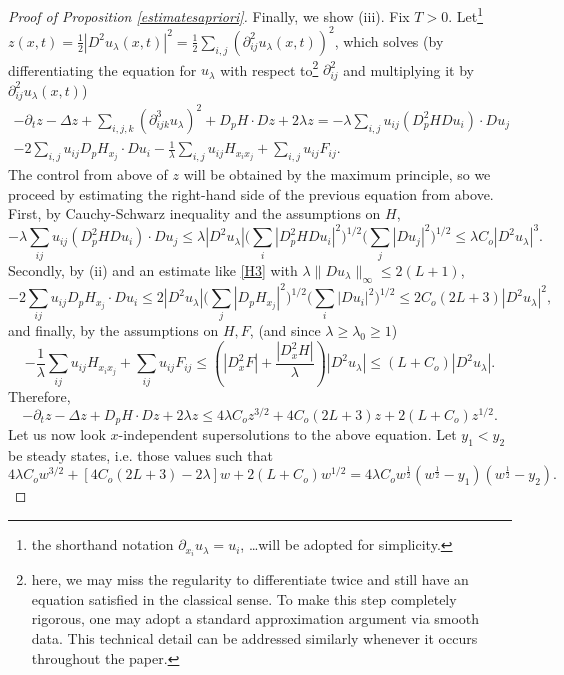 \documentclass{amsart}
\theoremstyle{remark}
\theoremstyle{definition}
\theoremstyle{Claim}
\theoremstyle{plain}
\begin{document}
\begin{proof}[Proof of Proposition \ref{estimatesapriori}]
		Finally, we show (iii). Fix $T>0$. Let\footnote{the shorthand notation $\partial_{x_i} u_\lambda = u_i$, \ldots will be adopted for simplicity.} $z(x,t) = \frac12 |D^2 u_\lambda(x,t)|^2 = \frac12\sum_{i,j} (\partial^2_{ij} u_\lambda(x,t))^2$, which solves (by differentiating the equation for $u_\lambda$ with respect to\footnote{here, we may miss the regularity to differentiate twice and still have an equation satisfied in the classical sense. To make this step completely rigorous, one may adopt a standard approximation argument via smooth data. This technical detail can be addressed similarly whenever it occurs throughout the paper.} $\partial^2_{ij}$ and multiplying it by $\partial^2_{ij} u_\lambda(x,t)$)
		\[
\begin{split}
	-\partial_t z-\Delta z + \displaystyle \sum_{i,j,k} (\partial^3_{ijk} u_\lambda)^2+D_pH \cdot Dz + 2\lambda z=  -\lambda \displaystyle  \sum_{i, j} u_{ij} (D^2_{p}H Du_i) \cdot Du_j \\- 2  \displaystyle  \sum_{i, j} u_{ij} D_pH_{x_j} \cdot Du_i - \frac1\lambda \sum_{i, j} u_{ij} H_{x_i x_j} + \sum_{i, j} u_{ij} F_{ij}.
\end{split}
		\]
		The control from above of $z$ will be obtained by the maximum principle, so we proceed by estimating the right-hand side of the previous equation from above. First, by Cauchy-Schwarz inequality and the assumptions on $H$,
		\[
		- \lambda \sum_{ij} u_{ij} (D^2_{p}H Du_i) \cdot Du_j \le \lambda |D^2 u_\lambda| \Big(\sum_i |D^2_{p}H Du_i|^2\Big)^{1/2} \Big(\sum_j |Du_j|^2\Big)^{1/2} \le \lambda C_o|D^2 u_\lambda|^3.
		\]
		Secondly, by (ii) and an estimate like  \eqref{H3} with $\lambda\lVert Du_\lambda\rVert_\infty\leq 2(L+1)$,
		\[
		- 2 \sum_{ij} u_{ij} D_pH_{x_j} \cdot Du_i \le 2 |D^2 u_\lambda| \Big(\sum_j |D_pH_{x_j}|^2\Big)^{1/2} \Big(\sum_i |Du_i|^2\Big)^{1/2} \le 2C_o(2L+3) |D^2 u_\lambda|^2,
		\]
		and finally, by the assumptions on $H,F$, (and since $\lambda \ge \lambda_0 \ge 1$)
		\[
		- \frac1\lambda \sum_{ij} u_{ij} H_{x_i x_j} + \sum_{ij} u_{ij} F_{ij} \le \left(|D^2_xF| + \frac{|D^2_xH|}{\lambda}\right)|D^2u_\lambda| \le (L + C_o)|D^2 u_\lambda|.
		\]
		Therefore, 
		\[
		-\partial_t z-\Delta z +D_p H\cdot Dz + 2\lambda z \le 4\lambda C_o z^{3/2} + 4C_o(2L+3) z + 2(L+C_o) z^{1/2}.
		\]
		Let us now look $x$-independent supersolutions to the above equation.
		Let $y_1 < y_2$ be steady states, i.e. those values such that
		\[
		4\lambda C_o w^{3/2} + [4C_o(2L+3) - 2\lambda] w + 2(L+C_o) w^{1/2}=4\lambda C_o  w^{\frac{1}{2}}(w^{\frac{1}{2}}-y_1)(w^{\frac{1}{2}}-y_2).
\]
\end{proof}
\end{document}
